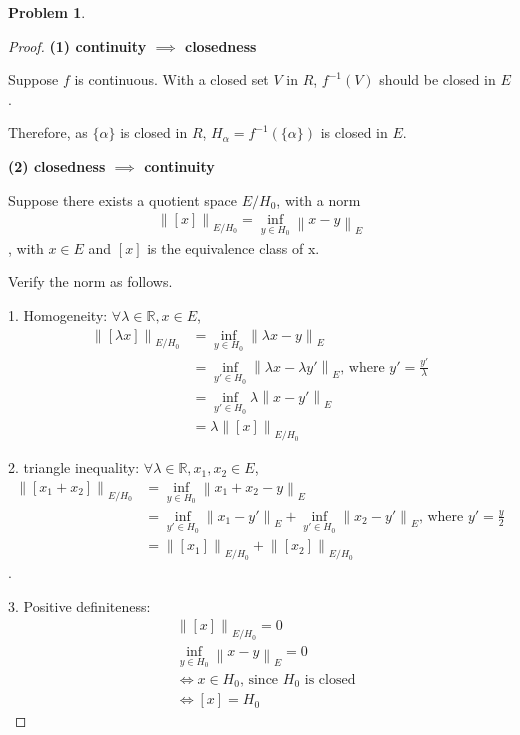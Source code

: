 \documentclass{article}
\newcommand{\norm}[1]{\left\|#1\right\|}
\newcommand{\R}{\mathbb{R}}
\newtheorem{problem}{Problem}
\begin{document}
\begin{problem}
\end{problem}
\begin{proof}
\textbf{(1) continuity $\implies$ closedness }

Suppose $f$ is continuous. 
With a closed set $V$ in $R$, $f^{-1}(V)$ should be closed in $E$.

Therefore, as $\{\alpha \}$ is closed in $R$, $H_{\alpha} = f^{-1}(\{\alpha \})$ is closed in $E$.

\textbf{(2) closedness $\implies$ continuity } 

Suppose there exists a quotient space $E / H_0$, with a norm
\begin{align}
    \norm{[x]}_{E / H_0} = \inf_{y \in H_0} \norm{x - y}_E
\end{align}
, with $x \in E$ and $[x]$ is the equivalence class of x.

Verify the norm as follows.

1. Homogeneity:
$\forall \lambda \in \R, x \in E$,
\begin{align}
    \norm{[\lambda x]}_{E / H_0} 
    &= \inf_{y \in H_0} \norm{\lambda x - y}_E
    \\
    &= \inf_{y' \in H_0} \norm{\lambda x - \lambda y'}_E
    \text{, where } y' = \frac{y'}{\lambda}
    \\
    &= \inf_{y' \in H_0} \lambda \norm{x - y'}_E
    \\
    &= \lambda \norm{[x]}_{E / H_0} 
\end{align}

2. triangle inequality:
$\forall \lambda \in \R, x_1, x_2 \in E$,
\begin{align}
    \norm{[x_1 + x_2]}_{E / H_0} 
    &= \inf_{y \in H_0} \norm{ x_1 + x_2 - y}_E
    \\
    &= \inf_{y' \in H_0} \norm{ x_1 -  y'}_E + \inf_{y' \in H_0} \norm{ x_2 -  y'}_E
    \text{, where } y' = \frac{y}{2}
    \\
    &= \norm{[x_1]}_{E / H_0} + \norm{[x_2]}_{E / H_0}
\end{align}
.

3. Positive definiteness:
\begin{align}
    &\norm{[x]}_{E / H_0} = 0
    \\
    &\inf_{y \in H_0} \norm{ x - y}_E = 0
    \\
    &\iff x \in H_0
    \text{, since $H_0$ is closed}
    \\
    &\iff [x] = H_0
\end{align}


\end{proof}
\end{document}
